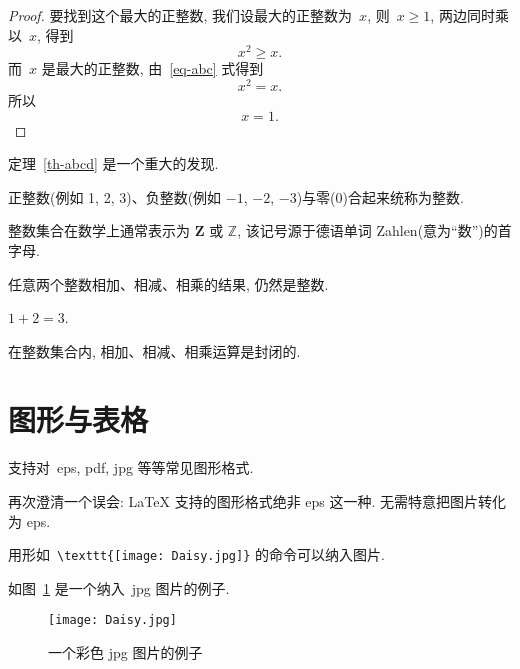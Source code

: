 \documentclass{NJUPTThesis}%
\begin{document}
\begin{proof}
要找到这个最大的正整数, 我们设最大的正整数为~$x$, 则~$x \geqslant 1$, 两边同时乘以~$x$, 得到
\begin{equation}\label{eq-abc}
x^2 \geqslant x.
\end{equation}
而~$x$ 是最大的正整数, 由~\eqref{eq-abc} 式得到
\[
x^2 = x.
\]
所以
\begin{equation*}
x = 1.
\end{equation*}
\end{proof}

定理~\ref{th-abcd} 是一个重大的发现.

\begin{definition}[整数]
 正整数(例如 1, 2, 3)、负整数(例如 ${−1}$, $−2$, $−3$)与零(0)合起来统称为{\heiti 整数}.
\end{definition}

\begin{remark}
  整数集合在数学上通常表示为 $\mathbf{Z}$ 或 $\mathbb{Z}$, 该记号源于德语单词 Zahlen(意为``数'')的首字母.
\end{remark}

\begin{proposition}
任意两个整数相加、相减、相乘的结果, 仍然是整数.
\end{proposition}

\begin{example}
  $1+2=3$.
\end{example}

\begin{corollary}
   在整数集合内, 相加、相减、相乘运算是封闭的.
\end{corollary}

\section{图形与表格}

支持对~eps, pdf, jpg 等等常见图形格式.

再次\colorbox{red!45}{澄清一个误会}: \LaTeX{} 支持的图形格式绝非 eps 这一种. 无需特意把图片转化为 eps.

用形如~\verb|\texttt{[image: Daisy.jpg]}| 的命令可以纳入图片.

如图~\ref{fig:1} 是一个纳入~jpg 图片的例子.

\begin{figure}[ht]
\centering
  \texttt{[image: Daisy.jpg]}
  \caption{一个彩色 jpg 图片的例子}
  \label{fig:1}
\end{figure}
\end{document}
